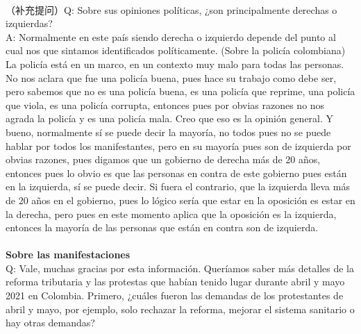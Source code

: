 \documentclass{phyasgn}\usepackage{nag}
\begin{document}
\\
（补充提问）Q: Sobre sus opiniones políticas, ¿son principalmente derechas o izquierdas?\\
A: Normalmente en este país siendo derecha o izquierdo depende del punto al cual nos que sintamos identificados políticamente. (Sobre la policía colombiana) La policía está en un marco, en un contexto muy malo para todas las personas. No nos aclara que fue una policía buena, pues hace su trabajo como debe ser, pero sabemos que no es una policía buena, es una policía que reprime, una policía que viola, es una policía corrupta, entonces pues por obvias razones no nos agrada la policía y es una policía mala. Creo que eso es la opinión general. Y bueno, normalmente sí se puede decir la mayoría, no todos pues no se puede hablar por todos los manifestantes, pero en su mayoría pues son de izquierda por obvias razones, pues digamos que un gobierno de derecha más de 20 años, entonces pues lo obvio es que las personas en contra de este gobierno pues están en la izquierda, sí se puede decir. Si fuera el contrario, que la izquierda lleva más de 20 años en el gobierno, pues lo lógico sería que estar en la oposición es estar en la derecha, pero pues en este momento aplica que la oposición es la izquierda, entonces la mayoría de las personas que están en contra son de izquierda. \\
\\
\textbf{Sobre las manifestaciones}\\
Q: Vale, muchas gracias por esta información. Queríamos saber más detalles de la reforma tributaria y las protestas que habían tenido lugar durante abril y mayo 2021 en Colombia. Primero, ¿cuáles fueron las demandas de los protestantes de abril y mayo, por ejemplo, solo rechazar la reforma, mejorar el sistema sanitario o hay otras demandas?\\
\end{document}
